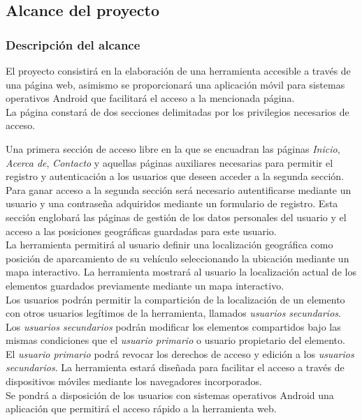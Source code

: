 	\subsection{Alcance del proyecto}
		\subsubsection{Descripción del alcance}
		\label{subsubsection:descripcion-alcance}
		El proyecto consistirá en la elaboración de una herramienta accesible a través de una página web, asimismo se proporcionará una aplicación móvil para sistemas operativos Android que facilitará el acceso a la mencionada página.
		\\La página constará de dos secciones delimitadas por los privilegios necesarios de acceso. 
		
		Una primera sección de acceso libre en la que se encuadran las páginas \textit{Inicio}, \textit{Acerca de}, \textit{Contacto} y aquellas páginas auxiliares necesarias para permitir el registro y autenticación a los usuarios que deseen acceder a la segunda sección.
		\\Para ganar acceso a la segunda sección será necesario autentificarse mediante un usuario y una contraseña adquiridos mediante un formulario de registro. Esta sección englobará las páginas de gestión de los datos personales del usuario y el acceso a las posiciones geográficas guardadas para este usuario.
		\\La herramienta permitirá al usuario definir una localización geográfica como posición de aparcamiento de su vehículo seleccionando la ubicación mediante un mapa interactivo.
		La herramienta mostrará al usuario la localización actual de los elementos guardados previamente mediante un mapa interactivo.
		\\Los usuarios podrán permitir la compartición de la localización de un elemento con otros usuarios legítimos de la herramienta, llamados \textit{usuarios secundarios}.
		\\Los \textit{usuarios secundarios} podrán modificar los elementos compartidos bajo las mismas condiciones que el \textit{usuario primario} o usuario propietario del elemento.
		\\El \textit{usuario primario} podrá revocar los derechos de acceso y edición a los \textit{usuarios secundarios}.
		La herramienta estará diseñada para facilitar el acceso a través de dispositivos móviles mediante los navegadores incorporados.
		\\Se pondrá a disposición de los usuarios con sistemas operativos Android una aplicación que permitirá el acceso rápido a la herramienta web.
	
